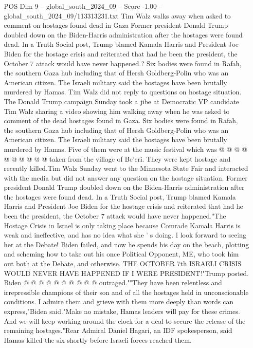 \begin{textsample}{POS Dim 9 – global\_south\_2024\_09 – Score -1.00 – global\_south\_2024\_09/113313231.txt}  \label{ex:f9_pos_259}
Tim Walz walks away when asked to comment on hostages found dead in Gaza Former president Donald Trump doubled down on the Biden-Harris administration after the hostages were found dead.
In a Truth Social post, Trump blamed Kamala Harris and President Joe Biden for the hostage crisis and reiterated that had he been the president, the October 7 attack would have never happened.?
Six bodies were found in Rafah, the southern Gaza hub including that of Hersh Goldberg-Polin who was an American citizen.
The Israeli military said the hostages have been brutally murdered by Hamas.
Tim Walz did not reply to questions on hostage situation.
The Donald Trump campaign Sunday took a jibe at Democratic VP candidate Tim Walz sharing a video showing him walking away when he was asked to comment of the dead hostages found in Gaza.
Six bodies were found in Rafah, the southern Gaza hub including that of Hersh Goldberg-Polin who was an American citizen.
The Israeli military said the hostages have been brutally murdered by Hamas.
Five of them were at the music festival which was @ @ @ @ @ @ @ @ @ @ taken from the village of Be'eri.
They were kept hostage and recently killed.Tim Walz Sunday went to the Minnesota State Fair and interacted with the media but did not answer any question on the hostage situation.
Former president Donald Trump doubled down on the Biden-Harris administration after the hostages were found dead.
In a Truth Social post, Trump blamed Kamala Harris and President Joe Biden for the hostage crisis and reiterated that had he been the president, the October 7 attack would have never happened."The Hostage Crisis in Israel is only taking place because Comrade Kamala Harris is weak and ineffective, and has no idea what she ' s doing.
I look forward to seeing her at the Debate!
Biden failed, and now he spends his day on the beach, plotting and scheming how to take out his once Political Opponent, ME, who took him out both at the Debate, and otherwise.
THE OCTOBER 7th ISRAELI CRISIS WOULD NEVER HAVE HAPPENED IF I WERE PRESIDENT!"Trump posted.
Biden @ @ @ @ @ @ @ @ @ @ outraged.""They have been relentless and irrepressible champions of their son and of all the hostages held in unconscionable conditions.
I admire them and grieve with them more deeply than words can express,"Biden said."Make no mistake, Hamas leaders will pay for these crimes.
And we will keep working around the clock for a deal to secure the release of the remaining hostages."Rear Admiral Daniel Hagari, an IDF spokesperson, said Hamas killed the six shortly before Israeli forces reached them.

\end{textsample}
